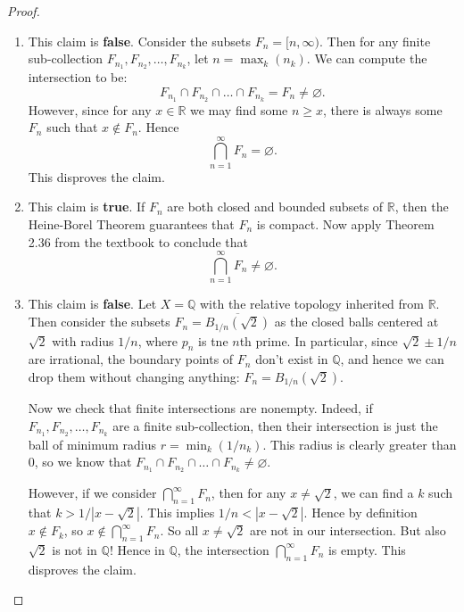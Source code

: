 \documentclass[12pt]{article}
\theoremstyle{remark}
\theoremstyle{named}
\begin{document}
\begin{proof}
    \hspace*{0in}
    \begin{enumerate}
        \item This claim is \textbf{false}. Consider the subsets \(F_n = [n, \infty)\). Then for any finite sub-collection \(F_{n_1}, F_{n_2}, \dots, F_{n_k}\), let \(n = \max_{k} (n_k)\). We can compute the intersection to be: 
        \[F_{n_1} \cap F_{n_2} \cap \dots \cap F_{n_k} = F_{n} \neq \varnothing.\]
        However, since for any \(x \in \mathbb R\) we may find some \(n \ge x\), there is always some \(F_n\) such that \(x \notin F_n\). Hence 
        \[\bigcap_{n=1}^\infty F_n = \varnothing.\]
        This disproves the claim.
        \item This claim is \textbf{true}. If \(F_n\) are both closed and bounded subsets of \(\mathbb R\), then the Heine-Borel Theorem guarantees that \(F_n\) is compact. Now apply Theorem 2.36 from the textbook to conclude that 
        \[\bigcap_{n = 1}^\infty F_n \neq \varnothing.\]
        \item This claim is \textbf{false}. Let \(X = \mathbb Q\) with the relative topology inherited from \(\mathbb R\). Then consider the subsets \(F_n = \overline{B_{1/ n}(\sqrt 2)}\) as the closed balls centered at \(\sqrt 2\) with radius \(1 / n\), where \(p_n\) is tne \(n\)th prime. 
        In particular, since \(\sqrt 2 \pm 1 / n\) are irrational, the boundary points of \(F_n\) don't exist in \(\mathbb Q\), and hence we can drop them without changing anything: \(F_n = B_{1/n}(\sqrt 2)\).
    
        Now we check that finite intersections are nonempty. Indeed, if \(F_{n_1}, F_{n_2}, \dots, F_{n_k}\) are a finite sub-collection, then their intersection is just the ball of minimum radius \(r = \min_{k} (1/n_k)\). This radius is clearly greater than \(0\), so we know that \(F_{n_1} \cap F_{n_2} \cap \dots \cap F_{n_k} \neq \varnothing\).
    
        However, if we consider \(\bigcap_{n = 1}^\infty F_n\), then for any \(x \neq \sqrt 2\), we can find a \(k\) such that \(k > 1 / |x - \sqrt 2|\). This implies \(1 / n < |x - \sqrt 2|\). Hence by definition \(x \notin F_k\), so \(x \notin \bigcap_{n = 1}^\infty F_n\). So all \(x \neq \sqrt 2\) are not in our intersection. But also \(\sqrt 2\) is not in \(\mathbb Q\)! Hence in \(\mathbb Q\), the intersection \(\bigcap_{n = 1}^\infty F_n\) is empty. This disproves the claim.    
    \end{enumerate}
\end{proof}
\end{document}
